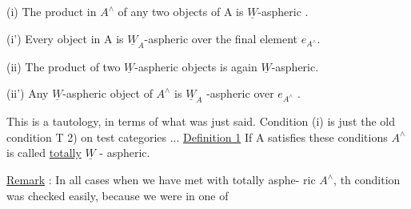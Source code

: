 (i)  The product  in $A^\wedge$ of any two objects of A is $\underline{W}$-aspheric .

(i') Every object in A is $\underline{W}_A$-aspheric over the final element $e_{A^\wedge}$.

(ii) The product of two $\underline{W}$-aspheric objects  is again $\underline{W}$-aspheric.

(ii')  Any $\underline{W}$-aspheric object of $A^\wedge$ is $\underline{W}_A$ -aspheric over $e_{A^\wedge}$ .

This is  a tautology,  in terms of what was just said.  Condition
(i)  is just the old condition T 2) on test categories ...
\uline{Definition 1}   If A satisfies these conditions\hand{,} $A^\wedge$is called \uline{totally} 
\uline{$\underline{W}$} - aspheric\hand{(*)}.

\uline{Remark} :  In all  cases when we have  met with totally asphe-%
ric $A^\wedge$,  th condition was checked easily,  because we were in one of
